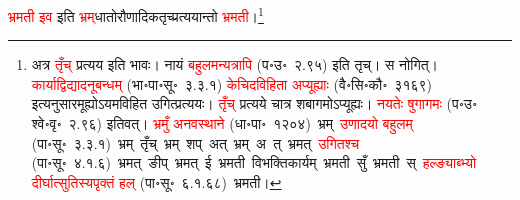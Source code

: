 \begin{sloppypar}
\textcolor{red}{भ्रमती इव} इति \textcolor{red}{भ्रम्‌}\-धातोरौणादिक\-तृच्प्रत्ययान्तो \textcolor{red}{भ्रमती}।\footnote{अत्र \textcolor{red}{तृँच्} प्रत्यय इति भावः। नायं \textcolor{red}{बहुलमन्यत्रापि} (प॰उ॰~२.९५) इति तृच्। स नोगित्। \textcolor{red}{कार्याद्विद्यादनूबन्धम्} (भा॰पा॰सू॰~३.३.१) \textcolor{red}{केचिदविहिता अप्यूह्याः} (वै॰सि॰कौ॰~३१६९) इत्यनुसारमूह्योऽ\-यमविहित उगित्प्रत्ययः। \textcolor{red}{तृँच्} प्रत्यये चात्र शबागमोऽप्यूह्यः। \textcolor{red}{नयतेः षुगागमः} (प॰उ॰ श्वे॰वृ॰~२.९६) इतिवत्। \textcolor{red}{भ्रमुँ अनवस्थाने} (धा॰पा॰~१२०४)~\arrow भ्रम्~\arrow \textcolor{red}{उणादयो बहुलम्} (पा॰सू॰~३.३.१)~\arrow भ्रम्~तृँच्~\arrow भ्रम्~शप्~अत्~\arrow भ्रम्~अ~त्~\arrow भ्रमत्~\arrow \textcolor{red}{उगितश्च} (पा॰सू॰~४.१.६)~\arrow भ्रमत्~ङीप्~\arrow भ्रमत्~ई~\arrow भ्रमती~\arrow विभक्तिकार्यम्~\arrow भ्रमती~सुँ~\arrow भ्रमती~स्~\arrow \textcolor{red}{हल्ङ्याब्भ्यो दीर्घात्सुतिस्यपृक्तं हल्} (पा॰सू॰~६.१.६८)~\arrow भ्रमती।}\end{sloppypar}
